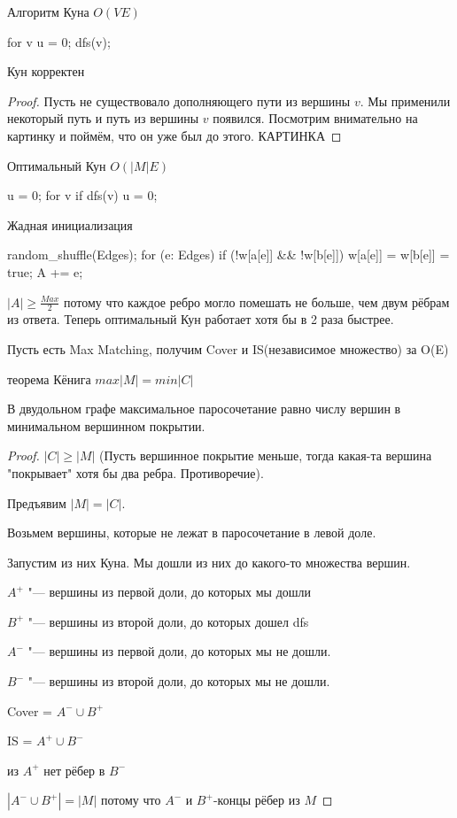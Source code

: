 Алгоритм Куна $O(VE)$
\begin{cppcode}
for v {
	u = 0;
	dfs(v);
}
\end{cppcode}
\begin{theorem}
Кун корректен
\end{theorem}
\begin{proof}
Пусть не существовало дополняющего пути из вершины $v$. Мы применили некоторый путь и путь из вершины $v$ появился. Посмотрим внимательно на картинку и поймём, что он уже был до этого.
КАРТИНКА
\end{proof}
Оптимальный Кун $O(|M|E)$
\begin{cppcode}
u = {0};
for v {
	if dfs(v) {
		u = {0};
	}
}
\end{cppcode}
Жадная инициализация
\begin{cppcode}
random_shuffle(Edges);
for (e: Edges) {
	if (!w[a[e]] && !w[b[e]]) {
		w[a[e]] = w[b[e]] = true;
		A += {e};
	}
}
\end{cppcode}
$|A| \ge \frac{Max}{2}$ потому что каждое ребро могло помешать не больше, чем двум рёбрам из ответа. Теперь оптимальный Кун работает хотя бы в 2 раза быстрее.

Пусть есть Max Matching, получим Cover и IS(независимое множество) за O(E)
\begin{theorem}{теорема Кёнига}
$max |M| = min |C|$

В двудольном графе максимальное паросочетание равно числу вершин в минимальном вершинном покрытии.
\end{theorem}
\begin{proof}
$|C| \ge |M|$ (Пусть вершинное покрытие меньше, тогда какая-та вершина "покрывает" хотя бы два ребра. Противоречие).

Предъявим $|M| = |C|$.

Возьмем вершины, которые не лежат в паросочетание в левой доле.

Запустим из них Куна. Мы дошли из них до какого-то множества вершин. 

$A^+$ "--- вершины из первой доли, до которых мы дошли

$B^+$ "--- вершины из второй доли, до которых дошел dfs

$A^-$ "--- вершины из первой доли, до которых мы не дошли.
 
$B^-$ "--- вершины из второй доли, до которых мы не дошли. 

Cover = $A^- \cup B^+$

IS = $A^+ \cup B^-$
\item из $A^+$ нет рёбер в $B^-$
\item $|A^- \cup B^+| = |M|$ потому что $A^-$ и $B^+$-концы рёбер из $M$
\end{proof}